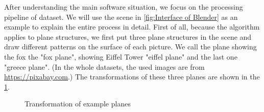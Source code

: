 After understanding the main software situation, we focus on the processing pipeline of dataset. We will use the scene in \cref{fig:Interface of Blender} as an example to explain the entire process in detail. First of all, because the algorithm applies to plane structures, we first put three plane structures in the scene and draw different patterns on the surface of each picture. We  call the plane showing the fox the "fox plane", showing Eiffel Tower "eiffel plane" and the last one "greece plane". (In the whole datasets, the used images are from \url{https://pixabay.com}.) The transformations of these three planes are shown in the \cref{fig:Transformation of example planes}.
\begin{figure}[tbp]
	\centering
	 \quad
	 \quad
	\caption{Transformation of example planes}
	\label{fig:Transformation of example planes}
\end{figure}

